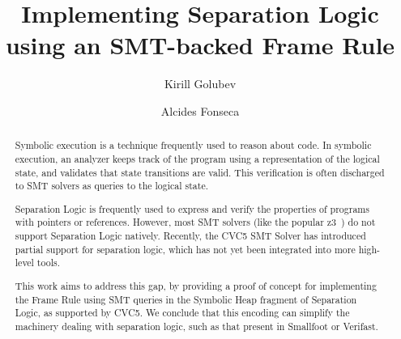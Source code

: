 \documentclass[sigplan,screen,review]{acmart}
\begin{document}
\title[Implementing Separation Logic using an SMT-backed Frame Rule]{Implementing Separation Logic \\ using an SMT-backed Frame Rule}

\author{Kirill Golubev}
\author{Alcides Fonseca}

\begin{abstract}


Symbolic execution is a technique frequently used to reason about code. In symbolic execution, an analyzer keeps track of the program using a representation of the logical state, and validates that state transitions are valid. This verification is often discharged to SMT solvers as queries to the logical state.

Separation Logic is frequently used to express and verify the properties of programs with pointers or references. However, most SMT solvers (like the popular z3~\cite{DBLP:conf/tacas/MouraB08}) do not support Separation Logic natively. Recently, the CVC5 SMT Solver has introduced partial support for separation logic, which has not yet been integrated into more high-level tools.

This work aims to address this gap, by providing a proof of concept for implementing the Frame Rule using SMT queries in the Symbolic Heap fragment of Separation Logic, as supported by CVC5. We conclude that this encoding can simplify the machinery dealing with separation logic, such as that present in Smallfoot or Verifast.

\end{abstract}
\end{document}
